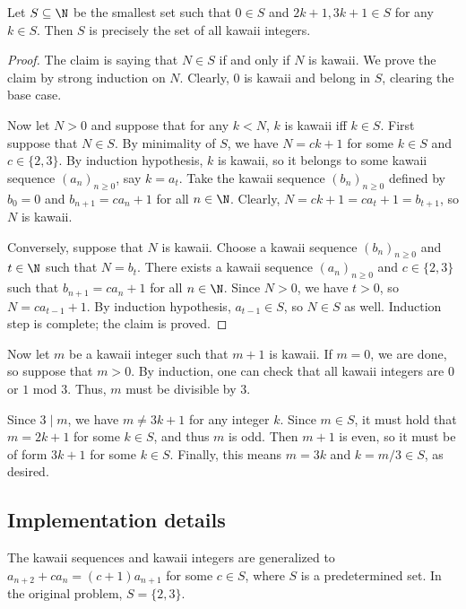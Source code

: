 \begin{claim}
Let $S \subseteq \N$ be the smallest set such that $0 \in S$ and $2k + 1, 3k + 1 \in S$ for any $k \in S$.
Then $S$ is precisely the set of all kawaii integers.
\end{claim}
\begin{proof}
The claim is saying that $N \in S$ if and only if $N$ is kawaii.
We prove the claim by strong induction on $N$.
Clearly, $0$ is kawaii and belong in $S$, clearing the base case.

Now let $N > 0$ and suppose that for any $k < N$, $k$ is kawaii iff $k \in S$.
First suppose that $N \in S$.
By minimality of $S$, we have $N = ck + 1$ for some $k \in S$ and $c \in \{2, 3\}$.
By induction hypothesis, $k$ is kawaii, so it belongs to some kawaii sequence $(a_n)_{n \geq 0}$, say $k = a_t$.
Take the kawaii sequence $(b_n)_{n \geq 0}$ defined by $b_0 = 0$ and $b_{n + 1} = c a_n + 1$ for all $n \in \N$.
Clearly, $N = ck + 1 = c a_t + 1 = b_{t + 1}$, so $N$ is kawaii.

Conversely, suppose that $N$ is kawaii.
Choose a kawaii sequence $(b_n)_{n \geq 0}$ and $t \in \N$ such that $N = b_t$.
There exists a kawaii sequence $(a_n)_{n \geq 0}$ and $c \in \{2, 3\}$ such that $b_{n + 1} = c a_n + 1$ for all $n \in \N$.
Since $N > 0$, we have $t > 0$, so $N = c a_{t - 1} + 1$.
By induction hypothesis, $a_{t - 1} \in S$, so $N \in S$ as well.
Induction step is complete; the claim is proved.
\end{proof}

Now let $m$ be a kawaii integer such that $m + 1$ is kawaii.
If $m = 0$, we are done, so suppose that $m > 0$.
By induction, one can check that all kawaii integers are $0$ or $1$ mod $3$.
Thus, $m$ must be divisible by $3$.

Since $3 \mid m$, we have $m \neq 3k + 1$ for any integer $k$.
Since $m \in S$, it must hold that $m = 2k + 1$ for some $k \in S$, and thus $m$ is odd.
Then $m + 1$ is even, so it must be of form $3k + 1$ for some $k \in S$.
Finally, this means $m = 3k$ and $k = m/3 \in S$, as desired.



\subsection*{Implementation details}

The kawaii sequences and kawaii integers are generalized to $a_{n + 2} + c a_n = (c + 1) a_{n + 1}$ for some $c \in S$, where $S$ is a predetermined set.
In the original problem, $S = \{2, 3\}$.
